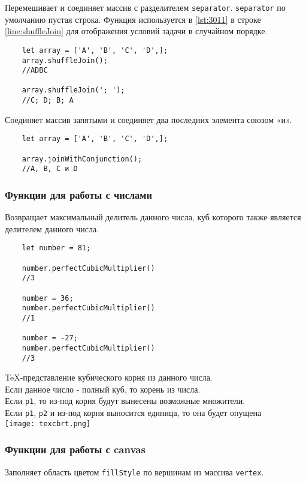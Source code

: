 Перемешивает и соединяет массив с разделителем \texttt{separator}. \texttt{separator} по умолчанию пустая строка. Функция используется в \ref{lst:3011}
в строке \ref{line:shuffleJoin} для отображения условий задачи в случайном порядке.

\begin{lstlisting}
    let array = ['A', 'B', 'C', 'D',];
    array.shuffleJoin();
    //ADBC

    array.shuffleJoin('; ');
    //C; D; B; A 
\end{lstlisting}

Соединяет массив запятыми и соединяет два последних элемента союзом «и».

\begin{lstlisting}
    let array = ['A', 'B', 'C', 'D',];

    array.joinWithConjunction();
    //A, B, C и D
\end{lstlisting}

\subsubsection{Функции для работы с числами}
Возвращает максимальный делитель данного числа, куб которого также является делителем данного числа.

\begin{lstlisting}
    let number = 81;

    number.perfectCubicMultiplier()
    //3

    number = 36;
    number.perfectCubicMultiplier()
    //1

    number = -27;
    number.perfectCubicMultiplier()
    //3
\end{lstlisting}

TeX-представление кубического корня из данного числа.\\
Если данное число - полный куб, то корень из числа.\\
Если \texttt{p1}, то из-под корня будут вынесены возможные множители.\\
Если \texttt{p1}, \texttt{p2} и из-под корня выносится единица, то она будет опущена\\
\texttt{[image: texcbrt.png]}

\subsubsection{Функции для работы с canvas}
Заполняет область цветом \texttt{fillStyle} по вершинам из массива \texttt{vertex}.

